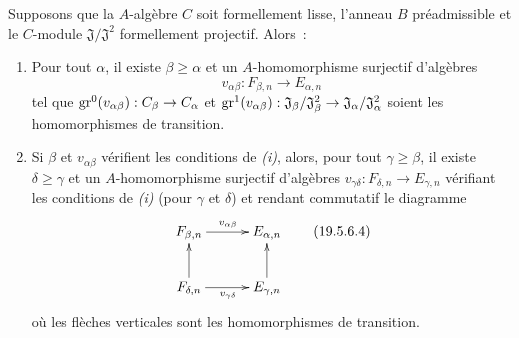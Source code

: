 \begin{lemma}[19.5.6.3]
\label{0.19.5.6.3-fr}
Supposons que la $A$-algèbre $C$ soit formellement lisse, l'anneau $B$
préadmissible et le $C$-module $\mathfrak J/\mathfrak J^2$ formellement
projectif. Alors~:
\begin{enumerate}
  \item[\rm(i)] Pour tout $\alpha$, il existe $\beta\geq\alpha$ et un
  $A$-homomorphisme surjectif d'algèbres
  \[
    v_{\alpha\beta}:F_{\beta,n}\longrightarrow E_{\alpha,n}
  \]
  tel que $\operatorname{gr}^0(v_{\alpha\beta}):C_\beta\to C_\alpha$ et
  $\operatorname{gr}^1(v_{\alpha\beta}):\mathfrak J_\beta/\mathfrak J_\beta^2
  \to\mathfrak J_\alpha/\mathfrak J_\alpha^2$ soient les homomorphismes de
  transition.
  \item[\rm(ii)] Si $\beta$ et $v_{\alpha\beta}$ vérifient les conditions de
  \emph{(i)}, alors, pour tout $\gamma\geq\beta$, il existe
  $\delta\geq\gamma$ et un $A$-homomorphisme surjectif d'algèbres
  $v_{\gamma\delta}:F_{\delta,n}\to E_{\gamma,n}$ vérifiant les conditions de
  \emph{(i)} (pour $\gamma$ et $\delta$) et rendant commutatif le diagramme
  \begin{equation}
  \label{0.19.5.6.4-fr}
  \xymatrix@C=3em{
    F_{\beta,n} \ar[r]^{v_{\alpha\beta}} & E_{\alpha,n} \\
    F_{\delta,n} \ar[u] \ar[r]_{v_{\gamma\delta}} & E_{\gamma,n} \ar[u]
  }
  \tag{19.5.6.4}
  \end{equation}
  où les flèches verticales sont les homomorphismes de transition.
\end{enumerate}
\end{lemma}

